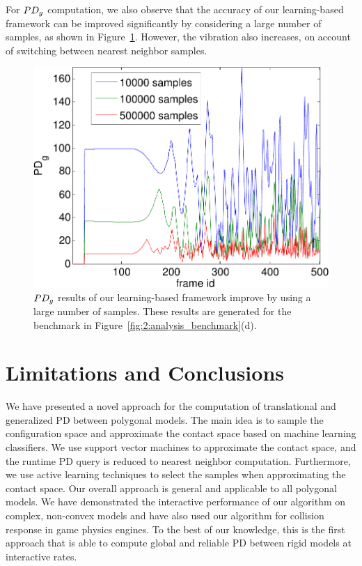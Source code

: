 For $\PDg$ computation, we also observe that the accuracy of our learning-based framework can be improved significantly by considering a large number of samples, as shown in Figure~\ref{fig:2:samplenumber}. However, the vibration also increases, on account of switching between nearest neighbor samples. 

\begin{figure}[!h]
\centering
\includegraphics[width=0.8\linewidth]{figs/2/Polydepth_comparison/samplenumber.pdf}
\caption[$\PDg$ results of our learning-based framework improve by using a large number of samples]{$\PDg$ results of our learning-based framework improve by using a large number of samples. These results are generated for the benchmark in Figure~\ref{fig:2:analysis_benchmark}(d).}\label{fig:2:samplenumber}
\end{figure}

\section{Limitations and Conclusions}
We have presented a novel approach for the computation of translational and generalized PD between polygonal models.
The main idea is to sample the configuration space and approximate the contact space based on
machine learning classifiers. We use support vector machines to approximate the contact space, and
the runtime PD query is reduced to nearest neighbor computation. Furthermore,
we use active learning techniques to select the samples when approximating the contact space.
Our overall approach is general and applicable to all polygonal models.
We have demonstrated the interactive performance of our algorithm on complex, non-convex models and have also used
our algorithm for collision response in game physics engines.
To the best of our knowledge, this is the first approach that is able to compute global and reliable PD between rigid models at
interactive rates.


